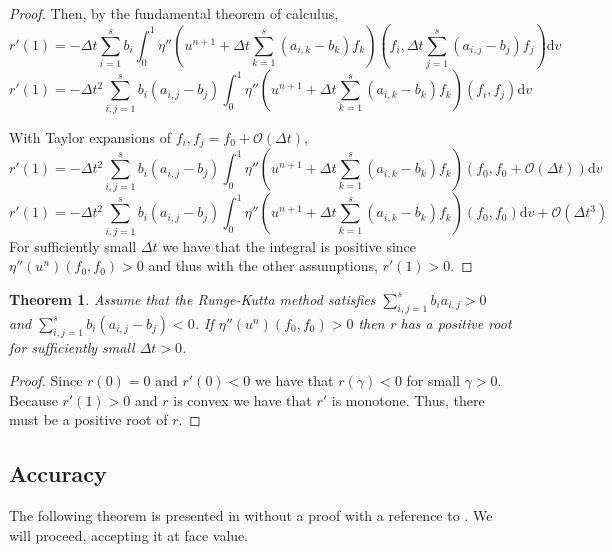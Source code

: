 \documentclass{article}
\newtheorem{theorem}{Theorem}[section]
\begin{document}
\begin{proof}
        Then, by the fundamental theorem of calculus,
        \begin{equation*}
            r'(1) = -\Delta t \sum_{i=1}^{s}b_i \int_{0}^{1} \eta'' \left(u^{n+1} + \Delta t \sum_{k=1}^s \left(a_{i,k}-b_k\right)f_k\right)\left(f_i,\Delta t \sum_{j=1}^s \left(a_{i,j}-b_j\right)f_j\right) \text{d}v
        \end{equation*}
        \begin{equation*}
            r'(1) = -\Delta t^2 \sum_{i,j=1}^{s}b_i\left(a_{i,j}-b_j\right) \int_{0}^{1} \eta'' \left(u^{n+1} + \Delta t \sum_{k=1}^s \left(a_{i,k}-b_k\right)f_k\right)\left(f_i,f_j\right) \text{d}v
        \end{equation*}

        With Taylor expansions of \(f_i, f_j = f_0 + \mathcal{O}(\Delta t)\),
        \begin{equation*}
            r'(1) = -\Delta t^2 \sum_{i,j=1}^{s}b_i\left(a_{i,j}-b_j\right) \int_{0}^{1} \eta'' \left(u^{n+1} + \Delta t \sum_{k=1}^s \left(a_{i,k}-b_k\right)f_k\right) \left(f_0,f_0+\mathcal{O}(\Delta t)\right) \text{d}v
        \end{equation*}
        \begin{equation*}
            r'(1) = -\Delta t^2 \sum_{i,j=1}^{s}b_i\left(a_{i,j}-b_j\right) \int_{0}^{1} \eta'' \left(u^{n+1} + \Delta t \sum_{k=1}^s \left(a_{i,k}-b_k\right)f_k\right) \left(f_0,f_0\right) \text{d}v+\mathcal{O}(\Delta t^3)
        \end{equation*}
        For sufficiently small \(\Delta t\) we have that the integral is positive since \(\eta''(u^n)(f_0,f_0) > 0\) and thus with the other assumptions, \(r'(1)>0\).
    \end{proof}

    \begin{theorem}
        Assume that the Runge-Kutta method satisfies \(\sum_{i,j=1}^{s} b_ia_{i,j}> 0\) and \(\sum_{i,j=1}^{s} b_i(a_{i,j}-b_j) < 0\). If \(\eta''(u^n)(f_0,f_0) > 0\) then r has a positive root for sufficiently small \(\Delta t > 0\).
    \end{theorem}
    \begin{proof}
        Since \(r(0)=0\) and \(r'(0) < 0\) we have that \(r(\gamma)<0\) for small \(\gamma > 0\). Because \(r'(1)>0\) and \(r\) is convex we have that \(r'\) is monotone. Thus, there must be a positive root of \(r\).
    \end{proof}


\subsection{Accuracy}
    The following theorem is presented in \cite{Ranocha_2020} without a proof with a reference to \cite{ketcheson2019relaxation}. We will proceed, accepting it at face value.
\end{document}
